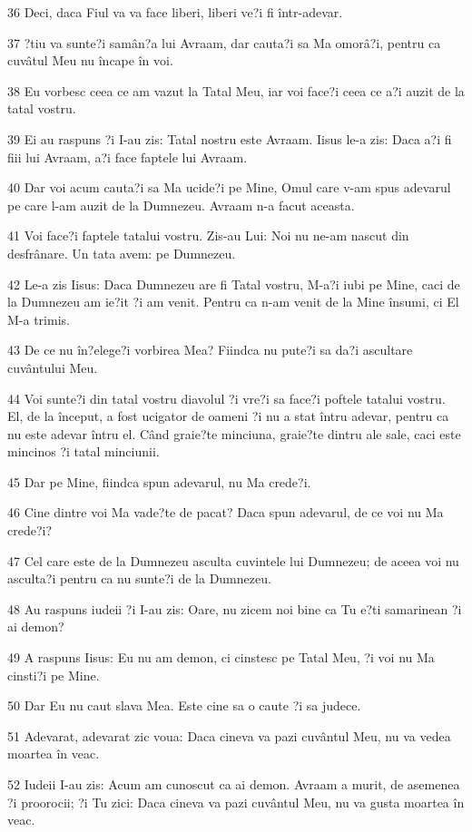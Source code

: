 \par 36 Deci, daca Fiul va va face liberi, liberi ve?i fi într-adevar.
\par 37 ?tiu va sunte?i samân?a lui Avraam, dar cauta?i sa Ma omorâ?i, pentru ca cuvâtul Meu nu încape în voi.
\par 38 Eu vorbesc ceea ce am vazut la Tatal Meu, iar voi face?i ceea ce a?i auzit de la tatal vostru.
\par 39 Ei au raspuns ?i I-au zis: Tatal nostru este Avraam. Iisus le-a zis: Daca a?i fi fiii lui Avraam, a?i face faptele lui Avraam.
\par 40 Dar voi acum cauta?i sa Ma ucide?i pe Mine, Omul care v-am spus adevarul pe care l-am auzit de la Dumnezeu. Avraam n-a facut aceasta.
\par 41 Voi face?i faptele tatalui vostru. Zis-au Lui: Noi nu ne-am nascut din desfrânare. Un tata avem: pe Dumnezeu.
\par 42 Le-a zis Iisus: Daca Dumnezeu are fi Tatal vostru, M-a?i iubi pe Mine, caci de la Dumnezeu am ie?it ?i am venit. Pentru ca n-am venit de la Mine însumi, ci El M-a trimis.
\par 43 De ce nu în?elege?i vorbirea Mea? Fiindca nu pute?i sa da?i ascultare cuvântului Meu.
\par 44 Voi sunte?i din tatal vostru diavolul ?i vre?i sa face?i poftele tatalui vostru. El, de la început, a fost ucigator de oameni ?i nu a stat întru adevar, pentru ca nu este adevar întru el. Când graie?te minciuna, graie?te dintru ale sale, caci este mincinos ?i tatal minciunii.
\par 45 Dar pe Mine, fiindca spun adevarul, nu Ma crede?i.
\par 46 Cine dintre voi Ma vade?te de pacat? Daca spun adevarul, de ce voi nu Ma crede?i?
\par 47 Cel care este de la Dumnezeu asculta cuvintele lui Dumnezeu; de aceea voi nu asculta?i pentru ca nu sunte?i de la Dumnezeu.
\par 48 Au raspuns iudeii ?i I-au zis: Oare, nu zicem noi bine ca Tu e?ti samarinean ?i ai demon?
\par 49 A raspuns Iisus: Eu nu am demon, ci cinstesc pe Tatal Meu, ?i voi nu Ma cinsti?i pe Mine.
\par 50 Dar Eu nu caut slava Mea. Este cine sa o caute ?i sa judece.
\par 51 Adevarat, adevarat zic voua: Daca cineva va pazi cuvântul Meu, nu va vedea moartea în veac.
\par 52 Iudeii I-au zis: Acum am cunoscut ca ai demon. Avraam a murit, de asemenea ?i proorocii; ?i Tu zici: Daca cineva va pazi cuvântul Meu, nu va gusta moartea în veac.
